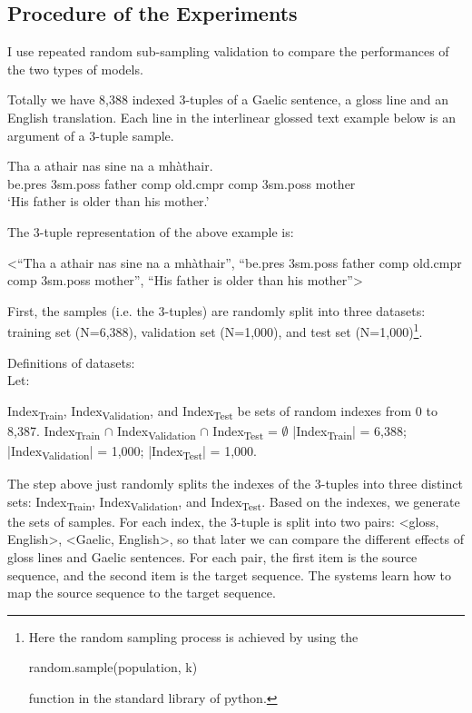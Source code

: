 \documentclass[final]{ua-thesis}
\numberwithin{equation}{section}
\begin{document}
\subsection{Procedure of the Experiments}
I use repeated random sub-sampling validation to compare the performances of the two types of models.

Totally we have 8,388 indexed 3-tuples of a Gaelic sentence, a gloss line and an English translation. Each line in the interlinear glossed text example below is an argument of a 3-tuple sample.

\begin{exe} 
\ex \gll    Tha a athair nas sine na a mh\`athair.\\ 
           be.pres 3sm.poss father comp old.cmpr comp 3sm.poss mother
\\ 
   \glt    `His father is older than his mother.' 
\end{exe}

The 3-tuple representation of the above example is:
\begin{exe}
\ex <``Tha a athair nas sine na a mh\`athair'', ``be.pres 3sm.poss father comp old.cmpr comp 3sm.poss mother'', ``His father is older than his mother''>
\end{exe}

First, the samples (i.e. the 3-tuples) are randomly split into three datasets: training set (N=6,388), validation set (N=1,000), and test set (N=1,000)\footnote{Here the random sampling process is achieved by using the \begin{myfont}random.sample(population, k)\end{myfont} function in the standard library of python.}.

\begin{exe}
\ex Definitions of datasets:\\
	Let:
	\begin{xlist}
	\ex 	Index\textsubscript{Train}, Index\textsubscript{Validation}, and Index\textsubscript{Test} be sets of random indexes from 0 to 8,387.
   \ex		Index\textsubscript{Train} $\cap$ Index\textsubscript{Validation} $\cap$ Index\textsubscript{Test} = $\emptyset$
   \ex 	|Index\textsubscript{Train}| = 6,388; |Index\textsubscript{Validation}| = 1,000; |Index\textsubscript{Test}| = 1,000.
   \end{xlist}
\end{exe}
The step above just randomly splits the indexes of the 3-tuples into three distinct sets: Index\textsubscript{Train}, Index\textsubscript{Validation}, and Index\textsubscript{Test}. Based on the indexes, we generate the sets of samples. For each index, the 3-tuple is split into two pairs: <gloss, English>, <Gaelic, English>, so that later we can compare the different effects of gloss lines and Gaelic sentences. For each pair, the first item is the source sequence, and the second item is the target sequence. The systems learn how to map the source sequence to the target sequence.   
\end{document}
